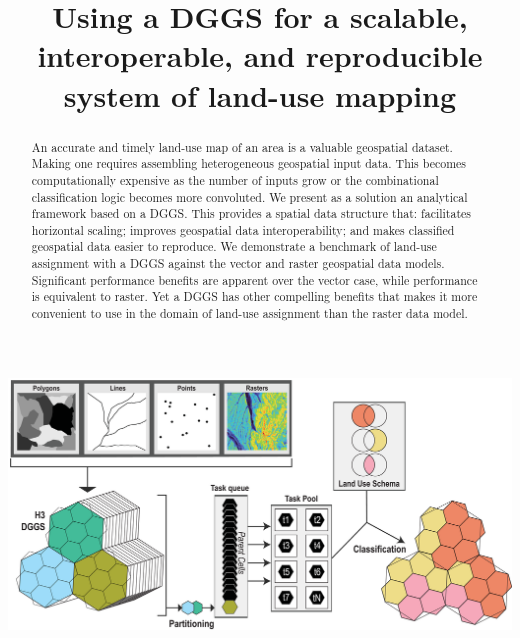 \documentclass[]{interact}
\theoremstyle{plain}%
\theoremstyle{definition}
\theoremstyle{remark}
\begin{document}

\title{Using a \acl{DGGS} for a scalable, interoperable, and reproducible system of land-use mapping}

\author{
    }

\maketitle

\begin{abstract}
An accurate and timely land-use map of an area is a valuable geospatial dataset. Making one requires assembling heterogeneous geospatial input data. This becomes computationally expensive as the number of inputs grow or the combinational classification logic becomes more convoluted. We present as a solution an analytical framework based on a \ac{DGGS}. This provides a spatial data structure that: facilitates horizontal scaling; improves geospatial data interoperability; and makes classified geospatial data easier to reproduce. We demonstrate a benchmark of land-use assignment with a \ac{DGGS} against the vector and raster geospatial data models. Significant performance benefits are apparent over the vector case, while performance is equivalent to raster. Yet a \ac{DGGS} has other compelling benefits that makes it more convenient to use in the domain of land-use assignment than the raster data model.
\end{abstract}


\begin{center}
\includegraphics[width=0.6\linewidth]{images/GraphicalAbstract1.eps}
\end{center}
\end{document}
